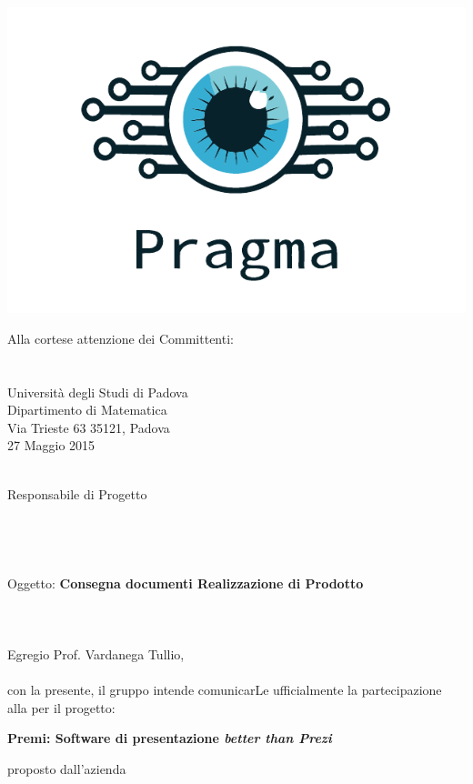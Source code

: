 \documentclass[12pt,a4paper]{article} %
\begin{document}
\begin{center}
\includegraphics[scale=0.6]{../template/icone/logo.pdf}
\end{center}
\hspace{\fill}\parbox[t]{8cm}{
\noindent
Alla cortese attenzione dei Committenti:\\
\committente \\
\committenteAlt \\
Università degli Studi di Padova \\
Dipartimento di Matematica \\
Via Trieste 63 35121, Padova \\
27 Maggio 2015
}
\\
Responsabile di Progetto\\
\gruppo \\
\groupmail \\
\\
\\
Oggetto: \textbf{Consegna documenti Realizzazione di Prodotto} \\
\\
\\
\\
\noindent Egregio Prof. Vardanega Tullio,\\
\\
con la presente, il gruppo \gruppo intende comunicarLe ufficialmente la partecipazione alla \RQ per il progetto:\\
\begin{center}
\textbf{Premi: Software di presentazione \textit{better than Prezi}}
\end{center}
proposto dall'azienda \proponente \\
\end{document}
